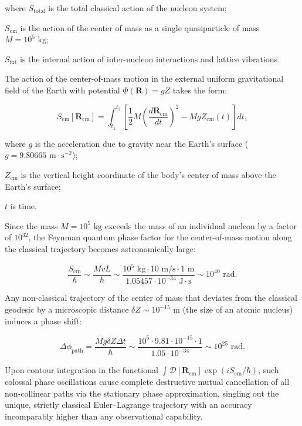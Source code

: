where $S_{\text{total}}$ is the total classical action of the nucleon system;  

$S_{\text{cm}}$ is the action of the center of mass as a single quasiparticle of mass $M = 10^5\text{ kg}$;  

$S_{\text{int}}$ is the internal action of inter-nucleon interactions and lattice vibrations.

The action of the center-of-mass motion in the external uniform gravitational field of the Earth with potential $\Phi(\mathbf{R}) = g Z$ takes the form:

\begin{equation}\label{eq:5.5}\tag{5.5}
S_{\text{cm}}[\mathbf{R}_{\text{cm}}] = \int_{t_1}^{t_2} \left[ \frac{1}{2} M \left( \frac{d\mathbf{R}_{\text{cm}}}{dt} \right)^2 - M g Z_{\text{cm}}(t) \right] dt,
\end{equation}

where $g$ is the acceleration due to gravity near the Earth's surface ($g = 9.80665\text{ m}\cdot\text{s}^{-2}$);  

$Z_{\text{cm}}$ is the vertical height coordinate of the body's center of mass above the Earth's surface;  

$t$ is time.

Since the mass $M = 10^5\text{ kg}$ exceeds the mass of an individual nucleon by a factor of $10^{32}$, the Feynman quantum phase factor for the center-of-mass motion along the classical trajectory becomes astronomically large:

\begin{equation}\label{eq:5.6}\tag{5.6}
\frac{S_{\text{cm}}}{\hbar} \sim \frac{M v L}{\hbar} \sim \frac{10^5\text{ kg} \cdot 10\text{ m/s} \cdot 1\text{ m}}{1.05457 \cdot 10^{-34}\text{ J}\cdot\text{s}} \sim 10^{40}\text{ rad}.
\end{equation}

Any non-classical trajectory of the center of mass that deviates from the classical geodesic by a microscopic distance $\delta Z \sim 10^{-15}\text{ m}$ (the size of an atomic nucleus) induces a phase shift:

\begin{equation}\label{eq:5.7}\tag{5.7}
\Delta \phi_{\text{path}} = \frac{M g \delta Z \Delta t}{\hbar} \sim \frac{10^5 \cdot 9.81 \cdot 10^{-15} \cdot 1}{1.05 \cdot 10^{-34}} \sim 10^{25}\text{ rad}.
\end{equation}

Upon contour integration in the functional $\int \mathcal{D}[\mathbf{R}_{\text{cm}}] \exp(i S_{\text{cm}}/\hbar)$, such colossal phase oscillations cause complete destructive mutual cancellation of all non-collinear paths via the stationary phase approximation, singling out the unique, strictly classical Euler--Lagrange trajectory with an accuracy incomparably higher than any observational capability.

